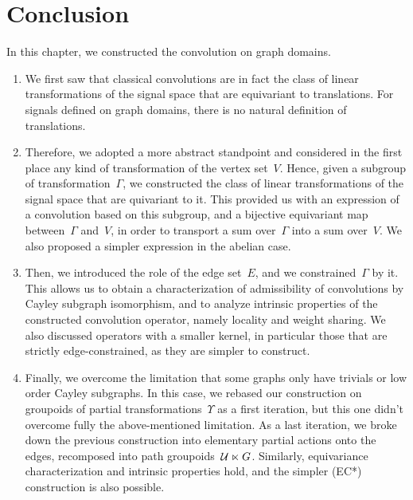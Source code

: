\section{Conclusion}

In this chapter, we constructed the convolution on graph domains.

\begin{enumerate}
\item We first saw that classical convolutions are in fact the class of linear transformations of the signal space that are equivariant to translations. For signals defined on graph domains, there is no natural definition of translations.
\item Therefore, we adopted a more abstract standpoint and considered in the first place any kind of transformation of the vertex set~$V$. Hence, given a subgroup of transformation~$\Gamma$, we constructed the class of linear transformations of the signal space that are quivariant to it. This provided us with an expression of a convolution based on this subgroup, and a bijective equivariant map between~$\Gamma$ and~$V$, in order to transport a sum over~$\Gamma$ into a sum over~$V$. We also proposed a simpler expression in the abelian case.
\item Then, we introduced the role of the edge set~$E$, and we constrained~$\Gamma$ by it. This allows us to obtain a characterization of admissibility of convolutions by Cayley subgraph isomorphism, and to analyze intrinsic properties of the constructed convolution operator, namely locality and weight sharing. We also discussed operators with a smaller kernel, in particular those that are strictly edge-constrained, as they are simpler to construct.
\item Finally, we overcome the limitation that some graphs only have trivials or low order Cayley subgraphs. In this case, we rebased our construction on groupoids of partial transformations~$\Upsilon$ as a first iteration, but this one didn't overcome fully the above-mentioned limitation. As a last iteration, we broke down the previous construction into elementary partial actions onto the edges, recomposed into path groupoids~$\mathcal{U} \ltimes G$. Similarly, equivariance characterization and intrinsic properties hold, and the simpler (EC*) construction is also possible.
\end{enumerate}

